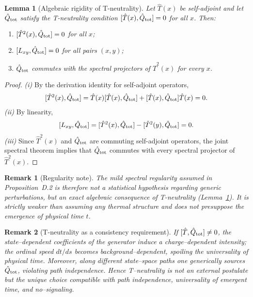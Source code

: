 \documentclass[12pt,a4paper]{article}
\newtheorem{lemma}{Lemma}[section]
\newtheorem{remark}{Remark}[section]
\numberwithin{equation}{section}
\begin{document}
\begin{lemma}[Algebraic rigidity of T-neutrality]\label{lem:algebraic-rigidity}
Let $\hat T(x)$ be self-adjoint and let $\hat Q_{\rm tot}$ satisfy the
T-neutrality condition $[\hat T(x),\hat Q_{\rm tot}]=0$ for all $x$. Then:
\begin{enumerate}[label=(\roman*),leftmargin=1.5cm,itemsep=0.15em]
\item $[\hat T^{2}(x),\hat Q_{\rm tot}]=0$ for all $x$;
\item $[L_{xy},\hat Q_{\rm tot}]=0$ for all pairs $(x,y)$;
\item $\hat Q_{\rm tot}$ commutes with the spectral projectors of $\hat T^{2}(x)$ for every $x$.
\end{enumerate}
\end{lemma}

\begin{proof}
\emph{(i)} By the derivation identity for self-adjoint operators,
\[
[\hat T^{2}(x),\hat Q_{\rm tot}]
=\hat T(x)[\hat T(x),\hat Q_{\rm tot}]
+[\hat T(x),\hat Q_{\rm tot}]\hat T(x)=0.
\]
\emph{(ii)} By linearity,
\[
[L_{xy},\hat Q_{\rm tot}]
=[\hat T^{2}(x),\hat Q_{\rm tot}]
-[\hat T^{2}(y),\hat Q_{\rm tot}]=0.
\]
\emph{(iii)} Since $\hat T^{2}(x)$ and $\hat Q_{\rm tot}$ are commuting
self-adjoint operators, the joint spectral theorem implies that
$\hat Q_{\rm tot}$ commutes with every spectral projector of $\hat T^{2}(x)$.
\end{proof}

\begin{remark}[Regularity note]
The mild spectral regularity assumed in Proposition~D.2 is therefore not a
statistical hypothesis regarding generic perturbations, but an exact
algebraic consequence of T-neutrality
(Lemma~\ref{lem:algebraic-rigidity}). It is strictly weaker than assuming
any thermal structure and does \emph{not} presuppose the emergence of
physical time $t$.
\end{remark}

\begin{remark}[T-neutrality as a consistency requirement]
If $[\hat T,\hat Q_{\rm tot}]\neq0$, the state–dependent coefficients of the generator induce a charge–dependent intensity; the ordinal speed $dt/ds$ becomes background–dependent, spoiling the universality of physical time. Moreover, along different state–space paths one generically sources $\hat Q_{\rm tot}$, violating path independence. Hence T–neutrality is not an external postulate but the unique choice compatible with path independence, universality of emergent time, and no–signaling.
\end{remark}
\end{document}
